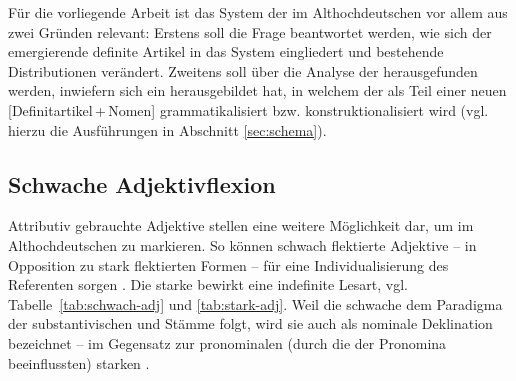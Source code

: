 Für die vorliegende Arbeit ist das System der  im Althochdeutschen  vor allem aus zwei Gründen relevant: Erstens soll die Frage beantwortet werden, wie sich der emergierende definite Artikel in das System eingliedert und bestehende Distributionen verändert. Zweitens soll über die Analyse der  herausgefunden werden, inwiefern sich ein  herausgebildet hat, in welchem der  als Teil einer neuen  [Definitartikel\,+\,Nomen] grammatikalisiert  bzw. konstruktionalisiert  wird (vgl. hierzu die Ausführungen in Abschnitt \ref{sec:schema}). 

\subsection{Schwache Adjektivflexion} \label{schwache-Adjektivflexion}\largerpage[-1.5]

Attributiv gebrauchte Adjektive  stellen eine weitere Möglichkeit dar, um im Althochdeutschen  zu markieren. So können schwach flektierte  Adjektive -- in Opposition zu stark flektierten Formen -- für eine Individualisierung des Referenten sorgen \parencite[68]{Szczepaniak2011a}. Die starke  bewirkt eine indefinite  Lesart, vgl. Tabelle~\ref{tab:schwach-adj} und \ref{tab:stark-adj}.  Weil die schwache  dem Paradigma der substantivischen  und Stämme folgt, wird sie auch als nominale Deklination bezeichnet -- im Gegensatz zur pronominalen  (durch die  der Pronomina beeinflussten) starken  \parencite[s.][251]{Meineke2001}. 

